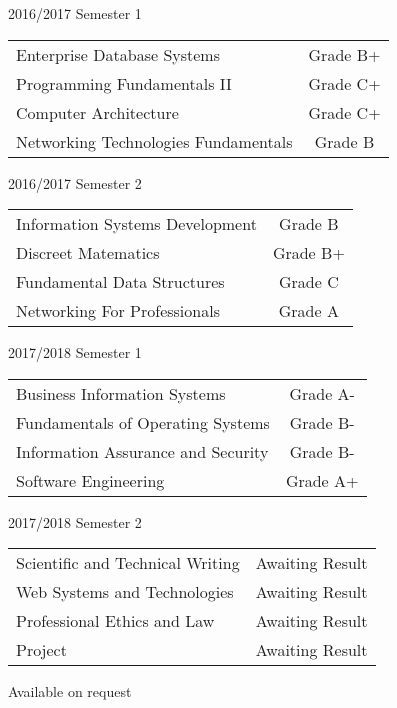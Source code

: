 \documentclass[10pt,a4paper,normalphoto]{altacv}
\begin{document}
\divider

2016/2017 Semester 1

\medskip
\begin{tabular}{ l c }
Enterprise Database Systems &  Grade B+\\
Programming Fundamentals II  & Grade C+\\
Computer Architecture & Grade C+\\
Networking Technologies Fundamentals & Grade B
\end{tabular}

\divider

2016/2017 Semester 2

\medskip
\begin{tabular}{ l c }
Information Systems Development &  Grade B\\
Discreet Matematics  & Grade B+\\
Fundamental Data Structures & Grade C\\
Networking For Professionals & Grade A
\end{tabular}

\divider

2017/2018 Semester 1

\medskip
\begin{tabular}{ l c }
Business Information Systems &  Grade A-\\
Fundamentals of Operating Systems & Grade B-\\
Information Assurance and Security & Grade B-\\
Software Engineering & Grade A+
\end{tabular}

\divider

2017/2018 Semester 2

\medskip
\begin{tabular}{ l c }
Scientific and Technical Writing &  Awaiting Result\\
Web Systems and Technologies & Awaiting Result\\
Professional Ethics and Law & Awaiting Result\\
Project & Awaiting Result
\end{tabular}

\divider

 Available on request
 



\end{document}
